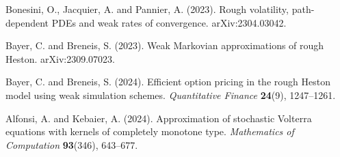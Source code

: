  Bonesini, O., Jacquier, A. and Pannier, A. (2023).
Rough volatility, path-dependent PDEs and weak rates of convergence.
arXiv:2304.03042.

 Bayer, C. and Breneis, S. (2023).
Weak Markovian approximations of rough Heston. arXiv:2309.07023.

 Bayer, C. and Breneis, S. (2024).
Efficient option pricing in the rough Heston model using weak simulation schemes.
\emph{Quantitative Finance} \textbf{24}(9), 1247--1261.

 Alfonsi, A. and Kebaier, A. (2024).
Approximation of stochastic Volterra equations with kernels of completely
monotone type. \emph{Mathematics of Computation} \textbf{93}(346), 643--677.



